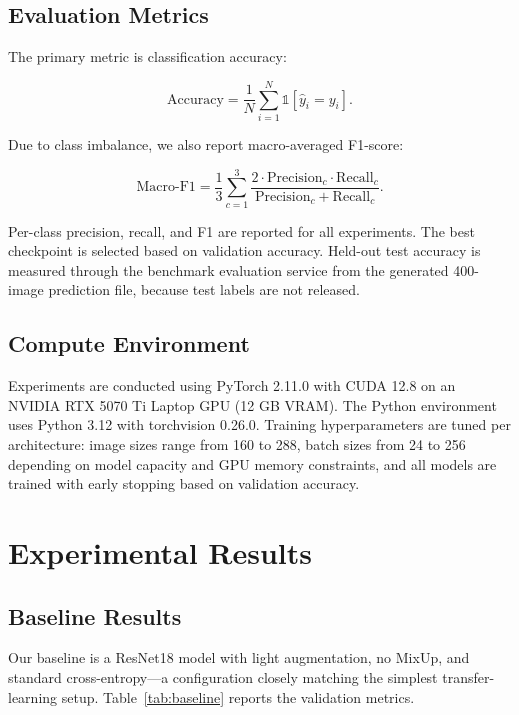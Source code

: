 \documentclass[10pt,twocolumn,letterpaper]{article}
\begin{document}
\subsection{Evaluation Metrics}

The primary metric is classification accuracy:

\begin{equation}
    \text{Accuracy} = \frac{1}{N} \sum_{i=1}^{N} \mathbb{1}[\hat{y}_i = y_i].
\end{equation}

Due to class imbalance, we also report macro-averaged F1-score:

\begin{equation}
    \text{Macro-F1} = \frac{1}{3} \sum_{c=1}^{3} \frac{2 \cdot \text{Precision}_c \cdot \text{Recall}_c}{\text{Precision}_c + \text{Recall}_c}.
\end{equation}

Per-class precision, recall, and F1 are reported for all experiments. The best checkpoint is selected based on validation accuracy. Held-out test accuracy is measured through the benchmark evaluation service from the generated 400-image prediction file, because test labels are not released.

\subsection{Compute Environment}

Experiments are conducted using PyTorch 2.11.0 with CUDA 12.8 on an NVIDIA RTX 5070 Ti Laptop GPU (12 GB VRAM). The Python environment uses Python 3.12 with torchvision 0.26.0. Training hyperparameters are tuned per architecture: image sizes range from 160 to 288, batch sizes from 24 to 256 depending on model capacity and GPU memory constraints, and all models are trained with early stopping based on validation accuracy.

\section{Experimental Results}\label{sec:results}

\subsection{Baseline Results}

Our baseline is a ResNet18 model with light augmentation, no MixUp, and standard cross-entropy---a configuration closely matching the simplest transfer-learning setup. Table~\ref{tab:baseline} reports the validation metrics.
\end{document}

